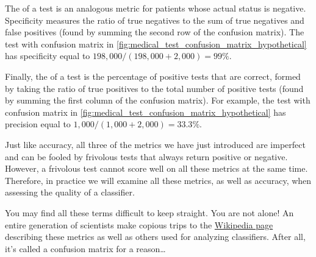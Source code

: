 The  of a test is an analogous metric for patients whose actual status is negative. Specificity measures the ratio of true negatives to the sum of true negatives and false positives (found by summing the second row of the confusion matrix). The test with confusion matrix in \autoref{fig:medical_test_confusion_matrix_hypothetical} has specificity equal to $198,000/(198,000 + 2,000) = 99\%$.

Finally, the  of a test is the percentage of positive tests that are correct, formed by taking the ratio of true positives to the total number of positive tests (found by summing the first column of the confusion matrix). For example, the test with confusion matrix in \autoref{fig:medical_test_confusion_matrix_hypothetical} has precision equal to $1,000/(1,000 + 2,000) = 33.3\%$.\\

\begin{qbox}\end{qbox}

Just like accuracy, all three of the metrics we have just introduced are imperfect and can be fooled by frivolous tests that always return positive or negative. However, a frivolous test cannot score well on all these metrics at the same time. Therefore, in practice we will examine all these metrics, as well as accuracy, when assessing the quality of a classifier.\\

\begin{qbox}\end{qbox}

You may find all these terms difficult to keep straight. You are not alone! An entire generation of scientists make copious trips to the \href{https://en.wikipedia.org/wiki/Precision_and_recall#Definition_(classification_context)}{Wikipedia page} describing these metrics as well as others used for analyzing classifiers. After all, it's called a confusion matrix for a reason\ldots

